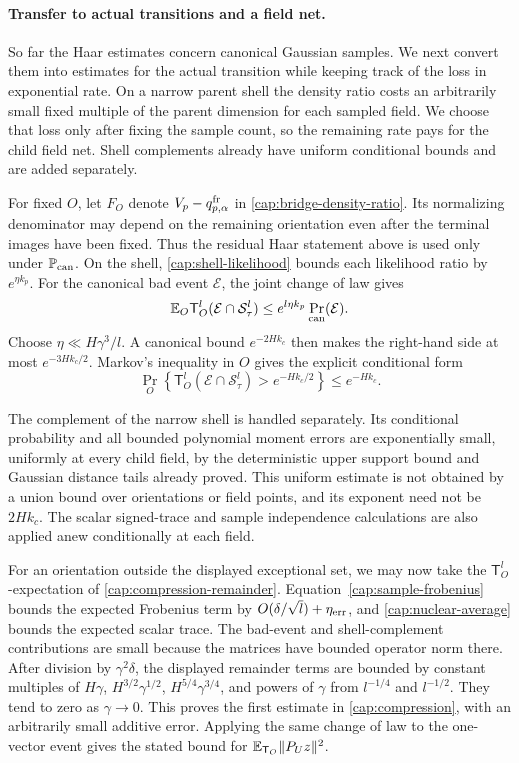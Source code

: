 \paragraph{Transfer to actual transitions and a field net.}
So far the Haar estimates concern canonical Gaussian samples. We next
convert them into estimates for the actual transition while keeping track
of the loss in exponential rate. On a narrow parent shell the density ratio
costs an arbitrarily small fixed multiple of the parent dimension for each
sampled field. We choose that loss only after fixing the sample count, so
the remaining rate pays for the child field net. Shell complements already
have uniform conditional bounds and are added separately.


For fixed \(O\), let \(F_O\) denote \(V_p-q_{p,\alpha}^{\rm fr}\) in
\eqref{cap:bridge-density-ratio}. Its normalizing denominator may depend on
the remaining orientation even after the terminal images have been fixed.
Thus the residual Haar statement above is used only under
\(\mathbb P_{\rm can}\). On the shell,
\eqref{cap:shell-likelihood} bounds each likelihood ratio by \(e^{\eta k_p}\).
For the canonical bad event \(\mathcal E\), the joint change of law gives
\[
 \mathbb E_O\mathsf T_O^l(\mathcal E\cap\mathcal S_\tau^l)
 \le e^{l\eta k_p}\Pr_{\rm can}(\mathcal E).
\]
Choose \(\eta\ll H\gamma^3/l\). A canonical bound \(e^{-2Hk_c}\)
then makes the right-hand side at most \(e^{-3Hk_c/2}\).
Markov's inequality in \(O\) gives the explicit conditional form
\[
 \Pr_O\left\{
 \mathsf T_O^l(\mathcal E\cap\mathcal S_\tau^l)>e^{-Hk_c/2}
 \right\}\le e^{-Hk_c}.
\]

The complement of the narrow shell is handled separately. Its conditional
probability and all bounded polynomial moment errors are exponentially small,
uniformly at every child field, by the deterministic upper support bound and
Gaussian distance tails already proved. This uniform estimate is not obtained
by a union bound over orientations or field points, and its exponent need not
be \(2Hk_c\). The scalar signed-trace and sample independence calculations
are also applied anew conditionally at each field.

For an orientation outside the displayed exceptional set, we may now take
the \(\mathsf T_O^l\)-expectation of \eqref{cap:compression-remainder}.
Equation~\eqref{cap:sample-frobenius} bounds the expected Frobenius term by
\(O(\delta/\sqrt l)+\eta_{\rm err}\), and
\eqref{cap:nuclear-average} bounds the expected scalar trace.
The bad-event and shell-complement contributions are small because the
matrices have bounded operator norm there. After division by
\(\gamma^2\delta\), the displayed remainder terms are bounded by constant
multiples of \(H\gamma\), \(H^{3/2}\gamma^{1/2}\),
\(H^{5/4}\gamma^{3/4}\), and powers of \(\gamma\) from
\(l^{-1/4}\) and \(l^{-1/2}\). They tend to zero as \(\gamma\to0\).
This proves the first estimate in \eqref{cap:compression}, with an
arbitrarily small additive error. Applying the same change of law to the
one-vector event gives the stated bound for
\(\mathbb E_{\mathsf T_O}\|P_Uz\|^2\).

